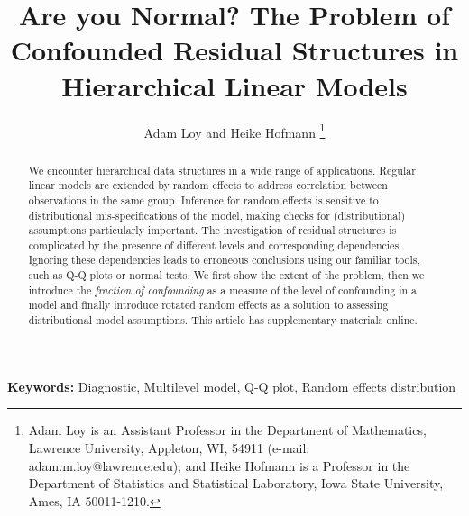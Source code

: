 \documentclass[12pt]{article} %
\begin{document}
\title{Are you Normal? The Problem of Confounded Residual Structures in Hierarchical Linear Models}
\author{{Adam Loy and Heike Hofmann}
\thanks{Adam Loy is an Assistant Professor in the Department of Mathematics, Lawrence University, Appleton, WI, 54911 (e-mail: adam.m.loy@lawrence.edu); and Heike Hofmann is a Professor in the Department of Statistics and Statistical Laboratory, Iowa State University, Ames, IA 50011-1210.}}

\maketitle


\begin{abstract}
We encounter hierarchical data structures in a wide range of applications. Regular linear models are extended by random effects to address correlation between observations in the same group. Inference for random effects is sensitive to  distributional mis-specifications of the model, making checks for (distributional) assumptions particularly important.  The investigation of residual structures is complicated by the presence of  different levels and corresponding  dependencies. Ignoring these dependencies leads to  erroneous conclusions using our familiar tools, such as Q-Q plots or normal tests. We first show the extent of the problem, then we introduce the {\it fraction of confounding} as a measure of the level of confounding in a model and finally introduce rotated random effects as a solution to assessing distributional model assumptions. This article has supplementary materials online.
\end{abstract}
{\bf Keywords:} Diagnostic, Multilevel model, Q-Q plot, Random effects distribution


\end{document}
